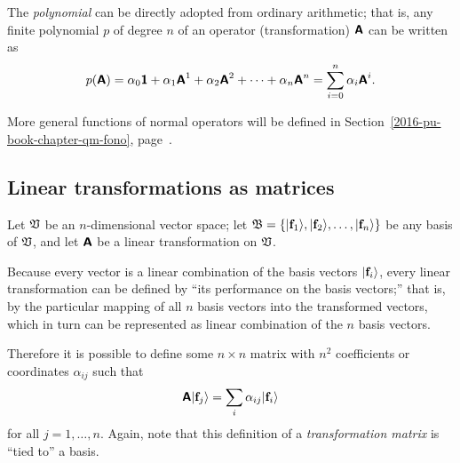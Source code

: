 The {\em polynomial}
can be directly adopted from ordinary arithmetic; that is,
any finite polynomial $p$ of degree $n$
of an operator (transformation) $\textsf{\textbf{A}}$ can be written as
\begin{equation}
p(\textsf{\textbf{A}})= \alpha_0   \textsf{\textbf{1}}
+ \alpha_1   \textsf{\textbf{A}}^1
+ \alpha_2   \textsf{\textbf{A}}^2+
\cdots
+
\alpha_n   \textsf{\textbf{A}}^n
=\sum_{i=0}^n \alpha_i \textsf{\textbf{A}}^i
.
\end{equation}

More general functions of normal operators will be defined in Section~\ref{2016-pu-book-chapter-qm-fono},
page~\pageref{2016-pu-book-chapter-qm-fono}.


\subsection{Linear transformations as matrices}



Let ${\frak V}$ be an $n$-dimensional vector space;
let
${\frak B}=\{\vert {\bf f}_1 \rangle ,\vert {\bf f}_2 \rangle,\ldots ,\vert {\bf f}_n \rangle\}$ be any basis of ${\frak V}$,
and let  $\textsf{\textbf{A}}$ be a linear transformation on ${\frak V}$.

Because every vector is a linear combination of the basis vectors
$\vert {\bf f}_i \rangle$,
every linear transformation can be defined by
``its performance on the basis vectors;'' that is,
by the particular mapping of
all $n$ basis vectors into the transformed vectors, which in turn can be represented as linear combination of the $n$ basis vectors.

Therefore it is possible to define some $n \times n$ matrix with $n^2$ coefficients or coordinates
$\alpha_{ij}$ such that~\cite[\S~37]{halmos-vs}
\begin{equation}
\textsf{\textbf{A}}\vert  {\bf f}_j \rangle = \sum_i \alpha_{ij}\vert {\bf f}_i  \rangle
\label{2015-m-ch-fdlvs-dtlt}
\end{equation}
for all $j=1,\ldots ,n$.
Again, note that this definition of a {\em transformation matrix}
is ``tied to'' a basis.

